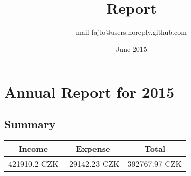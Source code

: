 \documentclass{article}
\title{Report}
\author{mail fajlo@users.noreply.github.com}
\date{June 2015}
\begin{document}
        \section*{Annual Report for 2015}

        \subsection*{Summary}
        \begin{center}
        \begin{tabular}{ | r | r | r | }
        \hline               

        \multicolumn{1}{|c|}{\bfseries Income} &
        \multicolumn{1}{|c|}{\bfseries Expense} &
        \multicolumn{1}{|c|}{\bfseries Total} \\
        \hline
        
        421910.2 CZK &
        -29142.23 CZK &
        392767.97 CZK \\

        \hline  
        \end{tabular}
        \end{center}
\end{document}

